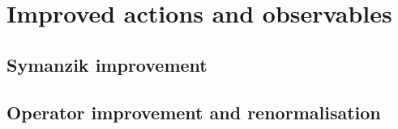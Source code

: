 \chapter{Improved actions and observables}
\label{ch:improvement-continuum}


\section{Symanzik improvement}

\section{Operator improvement and renormalisation}